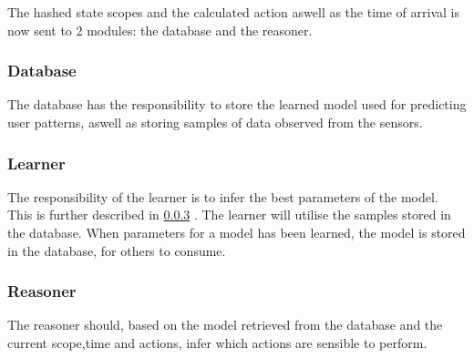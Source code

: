The hashed state scopes and the calculated action aswell as the time of arrival is now sent to 2 modules: the database and the reasoner.

\subsubsection{Database}
The database has the responsibility to store the learned model used for predicting user patterns, aswell as storing samples of data observed from the sensors.

\subsubsection{Learner}
The responsibility of the learner is to infer the best parameters of the model. This is further described in \cref{} . The learner will utilise the samples stored in the database. When parameters for a model has been learned, the model is stored in the database, for others to consume.

\subsubsection{Reasoner}
The reasoner should, based on the model retrieved from the database and the current scope,time and actions, infer which actions are sensible to perform.
